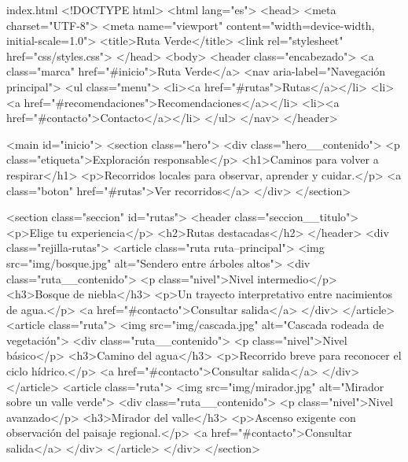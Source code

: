 \documentclass[11pt]{article}
\begin{document}
\begin{htmlfile}{index.html}
<!DOCTYPE html>
<html lang="es">
<head>
    <meta charset="UTF-8">
    <meta name="viewport" content="width=device-width, initial-scale=1.0">
    <title>Ruta Verde</title>
    <link rel="stylesheet" href="css/styles.css">
</head>
<body>
    <header class="encabezado">
        <a class="marca" href="#inicio">Ruta Verde</a>
        <nav aria-label="Navegación principal">
            <ul class="menu">
                <li><a href="#rutas">Rutas</a></li>
                <li><a href="#recomendaciones">Recomendaciones</a></li>
                <li><a href="#contacto">Contacto</a></li>
            </ul>
        </nav>
    </header>

    <main id="inicio">
        <section class="hero">
            <div class="hero__contenido">
                <p class="etiqueta">Exploración responsable</p>
                <h1>Caminos para volver a respirar</h1>
                <p>Recorridos locales para observar, aprender y cuidar.</p>
                <a class="boton" href="#rutas">Ver recorridos</a>
            </div>
        </section>

        <section class="seccion" id="rutas">
            <header class="seccion__titulo">
                <p>Elige tu experiencia</p>
                <h2>Rutas destacadas</h2>
            </header>
            <div class="rejilla-rutas">
                <article class="ruta ruta--principal">
                    <img src="img/bosque.jpg" alt="Sendero entre árboles altos">
                    <div class="ruta__contenido">
                        <p class="nivel">Nivel intermedio</p>
                        <h3>Bosque de niebla</h3>
                        <p>Un trayecto interpretativo entre nacimientos de agua.</p>
                        <a href="#contacto">Consultar salida</a>
                    </div>
                </article>
                <article class="ruta">
                    <img src="img/cascada.jpg" alt="Cascada rodeada de vegetación">
                    <div class="ruta__contenido">
                        <p class="nivel">Nivel básico</p>
                        <h3>Camino del agua</h3>
                        <p>Recorrido breve para reconocer el ciclo hídrico.</p>
                        <a href="#contacto">Consultar salida</a>
                    </div>
                </article>
                <article class="ruta">
                    <img src="img/mirador.jpg" alt="Mirador sobre un valle verde">
                    <div class="ruta__contenido">
                        <p class="nivel">Nivel avanzado</p>
                        <h3>Mirador del valle</h3>
                        <p>Ascenso exigente con observación del paisaje regional.</p>
                        <a href="#contacto">Consultar salida</a>
                    </div>
                </article>
            </div>
        </section>


\end{htmlfile}
\end{document}
